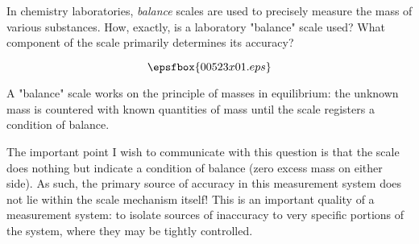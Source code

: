 

In chemistry laboratories, {\it balance} scales are used to precisely measure the mass of various substances.  How, exactly, is a laboratory "balance" scale used?  What component of the scale primarily determines its accuracy?

$$\epsfbox{00523x01.eps}$$







A "balance" scale works on the principle of masses in equilibrium: the unknown mass is countered with known quantities of mass until the scale registers a condition of balance.







The important point I wish to communicate with this question is that the scale does nothing but indicate a condition of balance (zero excess mass on either side).  As such, the primary source of accuracy in this measurement system does not lie within the scale mechanism itself!  This is an important quality of a measurement system: to isolate sources of inaccuracy to very specific portions of the system, where they may be tightly controlled.



